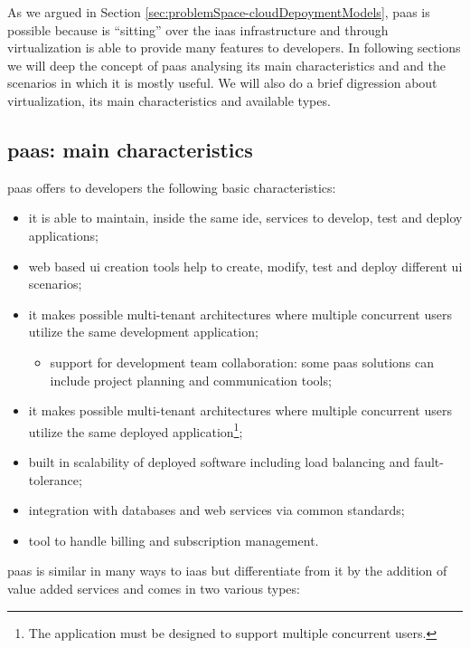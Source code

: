 As we argued in Section \ref{sec:problemSpace-cloudDepoymentModels}, \ac{paas} is possible because
is ``sitting'' over the \ac{iaas} infrastructure and through virtualization is able to provide many
features to developers. In following sections we will deep the concept of \ac{paas}
analysing its main characteristics and and the scenarios in which it is mostly useful. We will also
do a brief digression about virtualization, its main characteristics and available types.

\subsection{\acs{paas}: main characteristics}
\label{sec:problemSpace-paas-paasCharacteristics}
\ac{paas} offers to developers the following basic characteristics:

\begin{itemize}
	\item{it is able to maintain, inside the same \ac{ide}, services to develop, test and deploy
		applications;}
	\item{web based \ac{ui} creation tools help to create, modify, test and deploy different \ac{ui}
		scenarios;}
	\item{it makes possible multi-tenant architectures where multiple concurrent users utilize the same
		development application;}
	\begin{itemize}
		\item{support for development team collaboration: some \ac{paas} solutions can include project
			planning and communication tools;}
	\end{itemize}
	\item{it makes possible multi-tenant architectures where multiple concurrent users utilize the same
		deployed application\footnote{The application must be designed to support multiple concurrent
			users.};}
	\item{built in scalability of deployed software including load balancing and fault-tolerance;}
	\item{integration with databases and web services via common standards;}
	\item{tool to handle billing and subscription management.}
\end{itemize}

\ac{paas} is similar in many ways to \ac{iaas} but differentiate from it by the addition of value added
services and comes in two various types:

